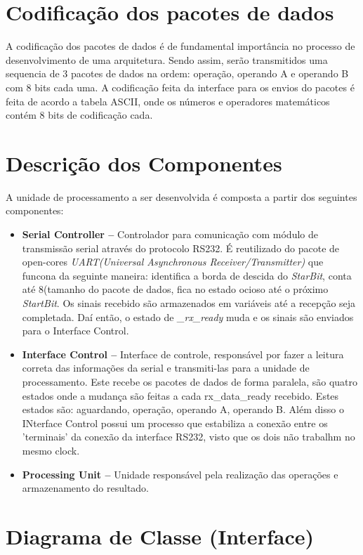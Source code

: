 \documentclass{report}
\begin{document}
	
	\section{Codificação dos pacotes de dados}
	A codificação dos pacotes de dados é de fundamental importância no processo de desenvolvimento de uma arquitetura. Sendo assim, serão transmitidos uma sequencia de 3 pacotes de dados na ordem: operação, operando A e operando B com 8 bits cada uma. A codificação feita da interface para os envios do pacotes é feita de acordo a tabela ASCII, onde os números e operadores matemáticos contém 8 bits de codificação cada.

	\section{Descrição dos Componentes}
  A unidade de processamento a ser desenvolvida é composta a partir dos seguintes componentes:

  \begin{itemize}
    \item \textbf{Serial Controller --} Controlador para comunicação com módulo de transmissão serial através do protocolo RS232. É reutilizado do pacote de open-cores \textit{UART(Universal Asynchronous Receiver/Transmitter) } que funcona da seguinte maneira: identifica a borda de descida do \textit{StarBit}, conta até 8(tamanho do pacote de dados, fica no estado ocioso até o próximo \textit{StartBit}. Os sinais recebido são armazenados em variáveis até a recepção seja completada. Daí então, o estado de \textit{_rx_ready} muda e os sinais são enviados para o Interface Control.
    \item \textbf{Interface Control --} Interface de controle, responsável por fazer a leitura correta das informações da serial e transmiti-las para a unidade de processamento. Este recebe os pacotes de dados de forma paralela, são quatro estados onde a mudança são feitas a cada rx_data_ready recebido. Estes estados são: aguardando, operação, operando A, operando B.
    Além disso o INterface Control possui um processo que estabiliza a conexão entre os 'terminais' da conexão da interface RS232, visto que os dois não trabalhm no mesmo clock.
    \item \textbf{Processing Unit --} Unidade responsável pela realização das operações e armazenamento do resultado. 
  \end{itemize}

  \section{Diagrama de Classe (Interface)}
  \begin{figure}[H]
    \centering
    
  \end{figure}
\end{document}
